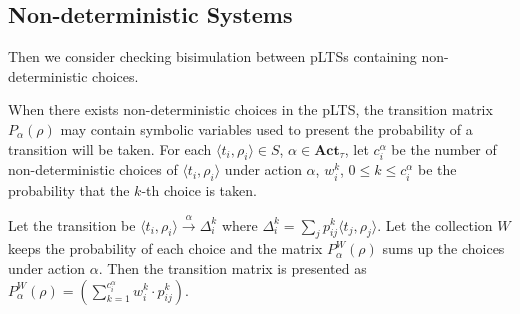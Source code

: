 \documentclass[runningheads]{llncs}
\newcommand{\pair}[1]{\langle{#1}\rangle}
\begin{document}

\subsection{Non-deterministic Systems}
Then we consider checking bisimulation between pLTSs containing non-deterministic choices.

When there exists non-deterministic choices in the pLTS, the transition matrix $P_{\alpha}(\rho)$ may contain symbolic variables used to present the probability of a transition will be taken. For each $\pair{t_{i}, \rho_i}\in S$, $\alpha\in \textbf{Act}_{\tau}$, let $c^{\alpha}_{i}$ be the number of non-deterministic choices of $\pair{t_{i}, \rho_i}$ under action $\alpha$, $w^{k}_{i}$, $0\leq k\leq c^{\alpha}_{i}$ be the probability that the $k$-th choice is taken. 

Let the transition be $\pair{t_{i}, \rho_i}\xrightarrow{\alpha}\Delta^{k}_{i}$ where $\Delta^{k}_{i}=\sum_{j}p^{k}_{ij}\pair{t_{j}, \rho_j}$. Let the collection $W$ keeps the probability of each choice and the matrix $P^{W}_{\alpha}(\rho)$ sums up the choices under action $\alpha$. 
Then the transition matrix is presented as $P^{W}_{\alpha}(\rho) = (\sum^{c^{\alpha}_{i}}_{k=1}w^{k}_{i}\cdot p^{k}_{ij})$. 

\end{document}
